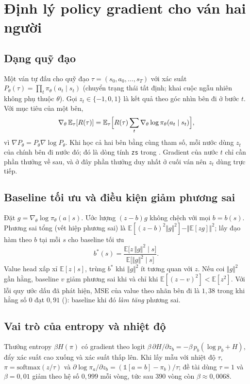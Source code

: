 \section{Định lý policy gradient cho ván hai người}
\label{sec:cs-pg-lt}
\subsection{Dạng quỹ đạo}
Một ván tự đấu cho quỹ đạo $\tau=(s_0,a_0,\dots,s_T)$ với xác suất
$P_\theta(\tau)=\prod_t\pi_\theta(a_t\mid s_t)$ (chuyển trạng thái tất định; khai cuộc ngẫu nhiên không phụ thuộc
$\theta$). Gọi $z_t\in\{-1,0,1\}$ là kết quả theo góc nhìn bên đi ở bước $t$. Với mục tiêu của một bên,
\begin{equation}
  \nabla_\theta\,\mathbb E_\tau[R(\tau)]
  =\mathbb E_\tau\Bigl[R(\tau)\sum_t\nabla_\theta\log\pi_\theta(a_t\mid s_t)\Bigr],
\end{equation}
vì $\nabla P_\theta=P_\theta\nabla\log P_\theta$. Khi học cả hai bên bằng cùng tham số, mỗi nước dùng $z_t$ của
chính bên đi nước đó; đó là dòng tính \texttt{zs} trong . Gradient của nước
$t$ chỉ cần phần thưởng về sau, và ở đây phần thưởng duy nhất ở cuối ván nên $z_t$ dùng trực tiếp.

\subsection{Baseline tối ưu và điều kiện giảm phương sai}
Đặt $g=\nabla_\theta\log\pi_\theta(a\mid s)$. Ước lượng $(z-b)g$ không chệch với mọi $b=b(s)$. Phương sai tổng
(vết hiệp phương sai) là $\mathbb E[(z-b)^2\Vert g\Vert^2]-\Vert\mathbb E[zg]\Vert^2$; lấy đạo hàm theo $b$ tại
mỗi $s$ cho baseline tối ưu
\begin{equation}
  b^*(s)=\frac{\mathbb E\bigl[z\,\Vert g\Vert^2\mid s\bigr]}{\mathbb E\bigl[\Vert g\Vert^2\mid s\bigr]}.
\end{equation}
Value head xấp xỉ $\mathbb E[z\mid s]$, trùng $b^*$ khi $\Vert g\Vert^2$ ít tương quan với $z$. Nếu coi
$\Vert g\Vert^2$ gần hằng, baseline $v$ giảm phương sai khi và chỉ khi $\mathbb E[(z-v)^2]<\mathbb E[z^2]$. Với lỗi
quy ước dấu đã phát hiện, MSE của value theo nhãn bên đi là $1{,}38$ trong khi hằng số 0 đạt $0{,}91$
(): baseline khi đó \emph{làm tăng} phương sai.

\subsection{Vai trò của entropy và nhiệt độ}
Thưởng entropy $\beta H(\pi)$ có gradient theo logit $\beta\,\partial H/\partial z_b=-\beta\,p_b(\log p_b+H)$, đẩy
xác suất cao xuống và xác suất thấp lên. Khi lấy mẫu với nhiệt độ $\tau$, $\pi=\mathrm{softmax}(z/\tau)$ và
$\partial\log\pi_a/\partial z_b=(\mathbb 1[a{=}b]-\pi_b)/\tau$; đề tài dùng $\tau=1$ và $\beta=0{,}01$ giảm theo
hệ số $0{,}999$ mỗi vòng, tức sau 390 vòng còn $\beta\approx0{,}0068$.

